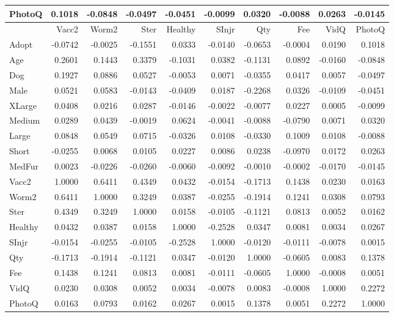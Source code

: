 \documentclass[12pt]{article}
\begin{document}
\begin{table}[]
\begin{tabular}{@{}l|rrrrrrrrr@{}}
			PhotoQ & 0.1018 & -0.0848 & -0.0497 & -0.0451 & -0.0099 & 0.0320 & -0.0088 & 0.0263 & -0.0145 \\ \midrule \midrule
			& Vacc2 & Worm2 & Ster & Healthy & SInjr & Qty & Fee & VidQ & PhotoQ \\ \midrule
			Adopt & -0.0742 & -0.0025 & -0.1551 & 0.0333 & -0.0140 & -0.0653 & -0.0004 & 0.0190 & 0.1018 \\
			Age & 0.2601 & 0.1443 & 0.3379 & -0.1031 & 0.0382 & -0.1131 & 0.0892 & -0.0160 & -0.0848 \\
			Dog & 0.1927 & 0.0886 & 0.0527 & -0.0053 & 0.0071 & -0.0355 & 0.0417 & 0.0057 & -0.0497 \\
			Male & 0.0521 & 0.0583 & -0.0143 & -0.0409 & 0.0187 & -0.2268 & 0.0326 & -0.0109 & -0.0451 \\
			XLarge & 0.0408 & 0.0216 & 0.0287 & -0.0146 & -0.0022 & -0.0077 & 0.0227 & 0.0005 & -0.0099 \\
			Medium & 0.0289 & 0.0439 & -0.0019 & 0.0624 & -0.0041 & -0.0088 & -0.0790 & 0.0071 & 0.0320 \\
			Large & 0.0848 & 0.0549 & 0.0715 & -0.0326 & 0.0108 & -0.0330 & 0.1009 & 0.0108 & -0.0088 \\
			Short & -0.0255 & 0.0068 & 0.0105 & 0.0227 & 0.0086 & 0.0238 & -0.0970 & 0.0172 & 0.0263 \\
			MedFur & 0.0023 & -0.0226 & -0.0260 & -0.0060 & -0.0092 & -0.0010 & -0.0002 & -0.0170 & -0.0145 \\
			Vacc2 & 1.0000 & 0.6411 & 0.4349 & 0.0432 & -0.0154 & -0.1713 & 0.1438 & 0.0230 & 0.0163 \\
			Worm2 & 0.6411 & 1.0000 & 0.3249 & 0.0387 & -0.0255 & -0.1914 & 0.1241 & 0.0308 & 0.0793 \\
			Ster & 0.4349 & 0.3249 & 1.0000 & 0.0158 & -0.0105 & -0.1121 & 0.0813 & 0.0052 & 0.0162 \\
			Healthy & 0.0432 & 0.0387 & 0.0158 & 1.0000 & -0.2528 & 0.0347 & 0.0081 & 0.0034 & 0.0267 \\
			SInjr & -0.0154 & -0.0255 & -0.0105 & -0.2528 & 1.0000 & -0.0120 & -0.0111 & -0.0078 & 0.0015 \\
			Qty & -0.1713 & -0.1914 & -0.1121 & 0.0347 & -0.0120 & 1.0000 & -0.0605 & 0.0083 & 0.1378 \\
			Fee & 0.1438 & 0.1241 & 0.0813 & 0.0081 & -0.0111 & -0.0605 & 1.0000 & -0.0008 & 0.0051 \\
			VidQ & 0.0230 & 0.0308 & 0.0052 & 0.0034 & -0.0078 & 0.0083 & -0.0008 & 1.0000 & 0.2272 \\
			PhotoQ & 0.0163 & 0.0793 & 0.0162 & 0.0267 & 0.0015 & 0.1378 & 0.0051 & 0.2272 & 1.0000 \\ \bottomrule
		\end{tabular} 
		\label{table:8}
	\end{table}
	
		
	
			
\end{document}
